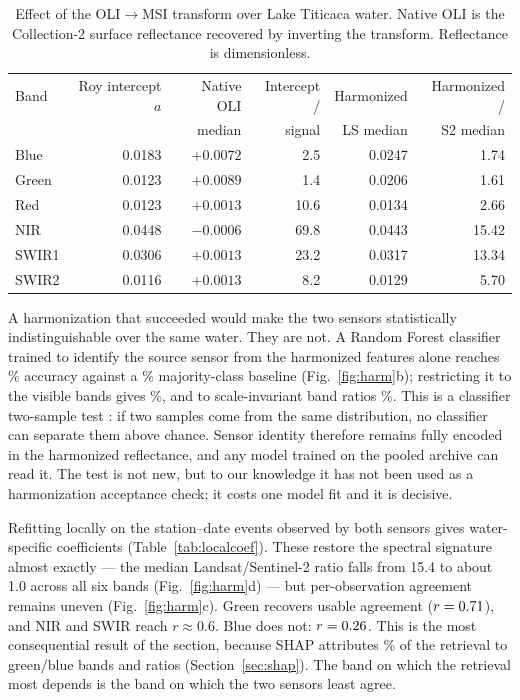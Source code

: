 \documentclass[final,5p,times,twocolumn,authoryear]{elsarticle}
\newcommand{\tabfit}{\small\setlength{\tabcolsep}{4pt}\renewcommand{\arraystretch}{1.08}}
\begin{document}
\begin{table}[htbp]
\caption{Effect of the \citet{Roy2016} OLI$\rightarrow$MSI transform over
Lake Titicaca water. Native OLI is the Collection-2 surface reflectance
recovered by inverting the transform. Reflectance is dimensionless.}
\label{tab:roy}
\tabfit
\centering
\begin{tabular}{@{}lrrrrr@{}}
\toprule
Band & Roy intercept $a$ & Native OLI & Intercept / & Harmonized & Harmonized / \\
     &                   & median     & signal      & LS median  & S2 median \\
\midrule
Blue   & 0.0183 & $+0.0072$ & 2.5  & 0.0247 & 1.74 \\
Green  & 0.0123 & $+0.0089$ & 1.4  & 0.0206 & 1.61 \\
Red    & 0.0123 & $+0.0013$ & 10.6 & 0.0134 & 2.66 \\
NIR    & 0.0448 & $-0.0006$ & 69.8 & 0.0443 & 15.42 \\
SWIR1  & 0.0306 & $+0.0013$ & 23.2 & 0.0317 & 13.34 \\
SWIR2  & 0.0116 & $+0.0013$ & 8.2  & 0.0129 & 5.70 \\
\bottomrule
\end{tabular}
\end{table}

A harmonization that succeeded would make the two sensors statistically
indistinguishable over the same water. They are not. A Random Forest
classifier trained to identify the source sensor from the harmonized features
alone reaches \numSensorAccAll\% accuracy against a \numSensorAccChance\%
majority-class baseline (Fig.~\ref{fig:harm}b); restricting it to the visible
bands gives \numSensorAccVisible\%, and to scale-invariant band ratios
\numSensorAccRatios\%. This is a classifier two-sample test
\citep{Friedman2004,LopezPaz2017}: if two samples come from the same
distribution, no classifier can separate them above chance. Sensor identity
therefore remains fully encoded in the harmonized reflectance, and any model
trained on the pooled archive can read it. The test is not new, but to our
knowledge it has not been used as a harmonization acceptance check; it costs
one model fit and it is decisive.

Refitting locally on the \numPairedEvents{} station--date events observed by
both sensors gives water-specific coefficients (Table~\ref{tab:localcoef}).
These restore the spectral signature almost exactly --- the median
Landsat/Sentinel-2 ratio falls from 15.4 to about 1.0 across all six bands
(Fig.~\ref{fig:harm}d) --- but per-observation agreement remains uneven
(Fig.~\ref{fig:harm}c). Green recovers usable agreement
($r=0.71$), and NIR and SWIR reach $r\approx0.6$. Blue does not:
$r=0.26$. This is the most consequential result of the section,
because SHAP attributes \numShapShareVerdeAzul\% of the retrieval to
green/blue bands and ratios (Section~\ref{sec:shap}). The band on which the
retrieval most depends is the band on which the two sensors least agree.
\end{document}
